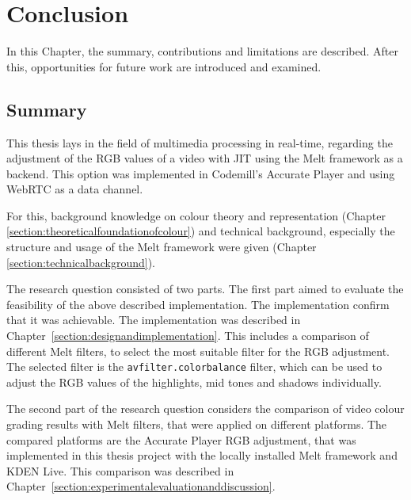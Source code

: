 \documentclass[../MasterThesis.tex]{subfiles}
\begin{document}
	
	
%
%
%
%
%
%
%
%
\newpage
\section{Conclusion} \label{section:conclusion}

In this Chapter, the summary, contributions and limitations are described. After this, opportunities for future work are introduced and examined.






\subsection{Summary} \label{subsection:summary}


This thesis lays in the field of multimedia processing in real-time, regarding the adjustment of the RGB values of a video with JIT using the Melt framework as a backend. This option was implemented in Codemill's Accurate Player and using WebRTC as a data channel.

For this, background knowledge on colour theory and representation (Chapter \ref{section:theoreticalfoundationofcolour}) and technical background, especially the structure and usage of the Melt framework were given (Chapter \ref{section:technicalbackground}).

The research question consisted of two parts. The first part aimed to evaluate the feasibility of the above described implementation. The implementation confirm that it was achievable. The implementation was described in Chapter~\ref{section:designandimplementation}. This includes a comparison of different Melt filters, to select the most suitable filter for the RGB adjustment. The selected filter is the \texttt{avfilter.colorbalance} filter, which can be used to adjust the RGB values of the highlights, mid tones and shadows individually.


The second part of the research question considers the comparison of video colour grading results with Melt filters, that were applied on different platforms. The compared platforms are the Accurate Player RGB adjustment, that was implemented in this thesis project with the locally installed Melt framework and KDEN Live. This comparison was described in Chapter~\ref{section:experimentalevaluationanddiscussion}.
\end{document}

